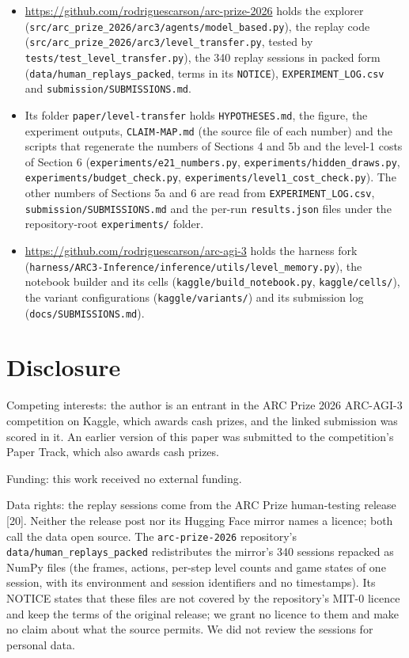 \documentclass[
  11pt,
]{article}
\providecommand{\tightlist}{%
  \setlength{\itemsep}{0pt}\setlength{\parskip}{0pt}}
\begin{document}
\begin{itemize}
\tightlist
\item
  \url{https://github.com/rodriguescarson/arc-prize-2026} holds the
  explorer (\texttt{src/arc\_prize\_2026/arc3/agents/model\_based.py}),
  the replay code
  (\texttt{src/arc\_prize\_2026/arc3/level\_transfer.py}, tested by
  \texttt{tests/test\_level\_transfer.py}), the 340 replay sessions in
  packed form (\texttt{data/human\_replays\_packed}, terms in its
  \texttt{NOTICE}), \texttt{EXPERIMENT\_LOG.csv} and
  \texttt{submission/SUBMISSIONS.md}.
\item
  Its folder \texttt{paper/level-transfer} holds \texttt{HYPOTHESES.md},
  the figure, the experiment outputs, \texttt{CLAIM-MAP.md} (the source
  file of each number) and the scripts that regenerate the numbers of
  Sections 4 and 5b and the level-1 costs of Section 6
  (\texttt{experiments/e21\_numbers.py},
  \texttt{experiments/hidden\_draws.py},
  \texttt{experiments/budget\_check.py},
  \texttt{experiments/level1\_cost\_check.py}). The other numbers of
  Sections 5a and 6 are read from \texttt{EXPERIMENT\_LOG.csv},
  \texttt{submission/SUBMISSIONS.md} and the per-run
  \texttt{results.json} files under the repository-root
  \texttt{experiments/} folder.
\item
  \url{https://github.com/rodriguescarson/arc-agi-3} holds the harness
  fork
  (\texttt{harness/ARC3-Inference/inference/utils/level\_memory.py}),
  the notebook builder and its cells
  (\texttt{kaggle/build\_notebook.py}, \texttt{kaggle/cells/}), the
  variant configurations (\texttt{kaggle/variants/}) and its submission
  log (\texttt{docs/SUBMISSIONS.md}).
\end{itemize}

\par\endgroup

\section{Disclosure}\label{disclosure}

Competing interests: the author is an entrant in the ARC Prize 2026
ARC-AGI-3 competition on Kaggle, which awards cash prizes, and the
linked submission was scored in it. An earlier version of this paper was
submitted to the competition's Paper Track, which also awards cash
prizes.

Funding: this work received no external funding.

Data rights: the replay sessions come from the ARC Prize human-testing
release {[}20{]}. Neither the release post nor its Hugging Face mirror
names a licence; both call the data open source. The
\texttt{arc-prize-2026} repository's
\texttt{data/human\_replays\_packed} redistributes the mirror's 340
sessions repacked as NumPy files (the frames, actions, per-step level
counts and game states of one session, with its environment and session
identifiers and no timestamps). Its NOTICE states that these files are
not covered by the repository's MIT-0 licence and keep the terms of the
original release; we grant no licence to them and make no claim about
what the source permits. We did not review the sessions for personal
data.
\end{document}
